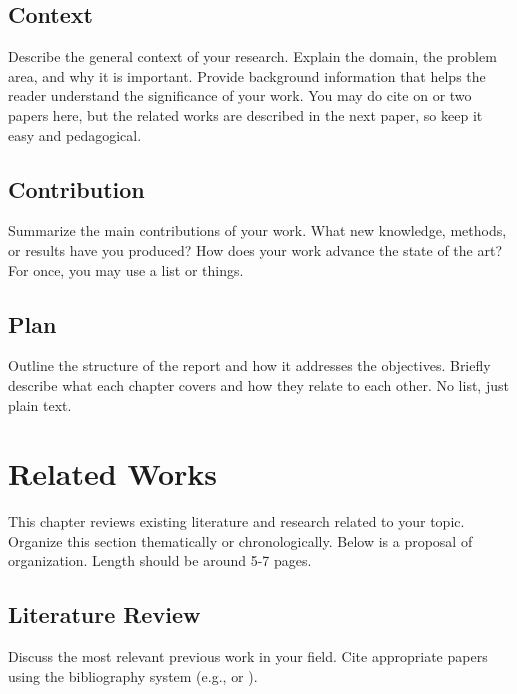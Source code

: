 \documentclass[12pt, a4paper]{report}
\begin{document}
\section{Context}
\label{sec:context}

Describe the general context of your research. 
Explain the domain, the problem area, and why it is important. 
Provide background information that helps the reader understand the significance of your work. 
You may do cite on or two papers here, but the related works are described in the next paper, so keep it easy and pedagogical. 

\section{Contribution}
\label{sec:contribution}

Summarize the main contributions of your work. 
What new knowledge, methods, or results have you produced? 
How does your work advance the state of the art? For once, you may use a list or things. 

\section{Plan}
\label{sec:plan}

Outline the structure of the report and how it addresses the objectives. 
Briefly describe what each chapter covers and how they relate to each other. 
No list, just plain text.

\lipsum


\chapter{Related Works}
\label{chap:related-works}

This chapter reviews existing literature and research related to your topic. 
Organize this section thematically or chronologically.
Below is a proposal of organization.
Length should be around 5-7 pages. 

\section{Literature Review}
\label{sec:literature-review}

Discuss the most relevant previous work in your field. 
Cite appropriate papers using the bibliography system (e.g., \cite{goodfellow2016deep} or \cite{knuth1984texbook,villalon2011some,xiao2022new,algis2024efficient,xiao2025monte,emami2026flexible}).
\end{document}
